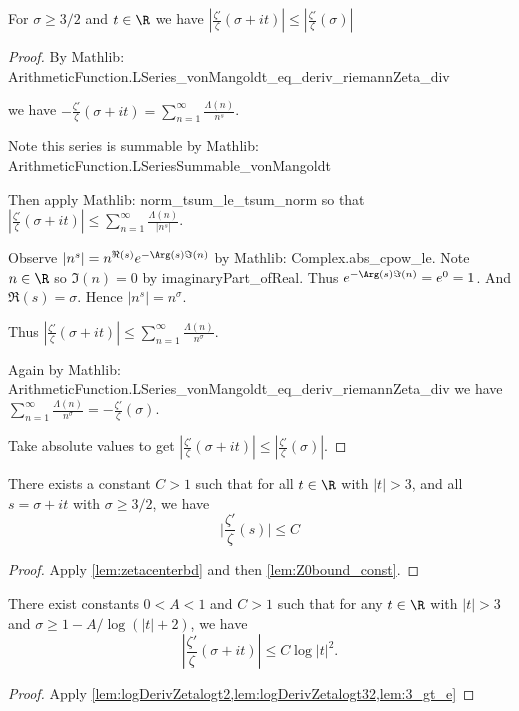\begin{lemma}\label{lem:zetacenterbd}  \leanok
For $\sigma \ge 3/2$ and $t\in\R$ we have $|\frac{\zeta'}{\zeta}(\sigma + it)| \le |\frac{\zeta'}{\zeta}(\sigma)|$
\end{lemma}
\begin{proof}
\leanok
By Mathlib: ArithmeticFunction.LSeries\_vonMangoldt\_eq\_deriv\_riemannZeta\_div

we have $-\frac{\zeta'}{\zeta}(\sigma + it) = \sum_{n=1}^\infty \frac{\Lambda(n)}{n^s}$.

Note this series is summable by Mathlib: ArithmeticFunction.LSeriesSummable\_vonMangoldt

Then apply Mathlib: norm\_tsum\_le\_tsum\_norm so that
$|\frac{\zeta'}{\zeta}(\sigma + it)| \le \sum_{n=1}^\infty \frac{\Lambda(n)}{|n^s|}$.

Observe $|n^s| = n^{\Re(s)}e^{-\Arg(s)\Im(n)}$ by Mathlib: Complex.abs\_cpow\_le.
Note $n\in\R$ so $\Im(n)=0$ by imaginaryPart\_ofReal. Thus $e^{-\Arg(s)\Im(n)} = e^0 = 1$.
And $\Re(s)=\sigma$. Hence $|n^s| = n^{\sigma}$.

Thus $|\frac{\zeta'}{\zeta}(\sigma + it)| \le \sum_{n=1}^\infty \frac{\Lambda(n)}{n^\sigma}$.

Again by Mathlib: ArithmeticFunction.LSeries\_vonMangoldt\_eq\_deriv\_riemannZeta\_div
we have$\sum_{n=1}^\infty \frac{\Lambda(n)}{n^\sigma} = -\frac{\zeta'}{\zeta}(\sigma)$.

Take absolute values to get $|\frac{\zeta'}{\zeta}(\sigma + it)| \le |\frac{\zeta'}{\zeta}(\sigma)|$.
\end{proof}

\begin{lemma} \label{lem:logDerivZetalogt32}  \leanok
There exists a constant $C>1$ such that for all $t\in\R$ with $|t|>3$, and all $s=\sigma+it$ with $\sigma \ge 3/2$, we have
\[ \Big|\frac{\zeta'}{\zeta}(s)\Big| \le C\]
\end{lemma}
\begin{proof}
\leanok
Apply \cref{lem:zetacenterbd} and then \cref{lem:Z0bound_const}.
\end{proof}


\begin{theorem} \label{thm:final_result}  \leanok
There exist constants $0<A<1$ and $C>1$ such that for any $t\in\R$ with $|t|>3$ and $\sigma \ge 1 - A/\log(|t|+2)$, we have
\[ \left|\frac{\zeta'}{\zeta}(\sigma + it)\right| \le C\log|t|^2. \]
\end{theorem}
\begin{proof}
\leanok
Apply \cref{lem:logDerivZetalogt2,lem:logDerivZetalogt32,lem:3_gt_e}
\end{proof}


